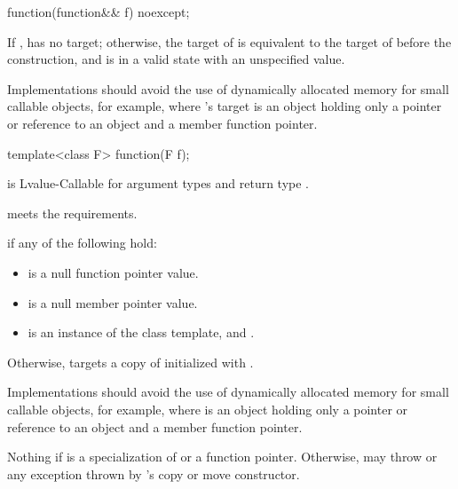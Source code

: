 %
\begin{itemdecl}
function(function&& f) noexcept;
\end{itemdecl}

\begin{itemdescr}
\pnum
\ensures
If ,  has no target;
otherwise, the target of  is equivalent to
the target of  before the construction, and
 is in a valid state with an unspecified value.

\pnum
\begin{note}
Implementations should avoid the use of
dynamically allocated memory for small callable objects, for example,
where 's target is an object holding only a pointer or reference
to an object and a member function pointer.
\end{note}
\end{itemdescr}

%
\begin{itemdecl}
template<class F> function(F f);
\end{itemdecl}

\begin{itemdescr}
\pnum
\constraints
{} is Lvalue-Callable for argument types
 and return type .

\pnum
\expects
{} meets the  requirements.

\pnum
\ensures
{} if any of the following hold:
\begin{itemize}
\item {} is a null function pointer value.
\item {} is a null member pointer value.
\item {} is an instance of the  class template, and
  .
\end{itemize}

\pnum
Otherwise,  targets a copy of 
initialized with .
\begin{note}
Implementations should avoid the use of
dynamically allocated memory for small callable objects, for example,
where  is an object holding only a pointer or
reference to an object and a member function pointer.
\end{note}

\pnum
\throws
Nothing if  is
a specialization of  or
a function pointer. Otherwise, may throw 
or any exception thrown by 's copy or move constructor.
\end{itemdescr}


